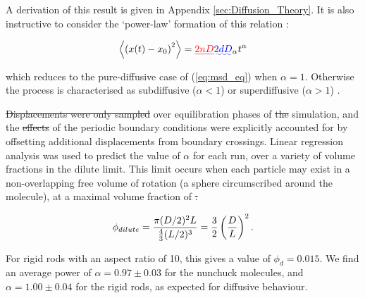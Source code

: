 \documentclass[11pt, a4paper]{article} %
\providecommand{\DIFadd}[1]{{\protect\color{blue}\uwave{#1}}} %
\providecommand{\DIFdel}[1]{{\protect\color{red}\sout{#1}}}                      %
\providecommand{\DIFaddbegin}{} %
\providecommand{\DIFaddend}{} %
\providecommand{\DIFdelbegin}{} %
\providecommand{\DIFdelend}{} %
\begin{document}
A derivation of this result is given in Appendix \ref{sec:Diffusion_Theory}. It is also instructive to consider the `power-law' formation of this relation \cite{Ernst2013}: 

\begin{equation}
\left\langle \left(x(t) - x_{0}\right)^{2} \right\rangle = \DIFdelbegin \DIFdel{2nD}\DIFdelend \DIFaddbegin \DIFadd{2dD}\DIFaddend _{\alpha}t^{\alpha}
\end{equation}

which reduces to the pure-diffusive case of (\ref{eq:msd_eq}) when $\alpha=1$. Otherwise the process is characterised as subdiffusive ($\alpha < 1$) or superdiffusive ($\alpha > 1$) \cite{Metzler2000}. 

\DIFdelbegin \DIFdel{Displacements were only sampled }\DIFdelend \DIFaddbegin \DIFadd{\textcolor{forestgreen}{Displacements were only sampled} }\DIFaddend over equilibration phases of \DIFdelbegin \DIFdel{the }\DIFdelend \DIFaddbegin \DIFadd{our }\DIFaddend simulation, and the \DIFdelbegin \DIFdel{effects }\DIFdelend \DIFaddbegin \DIFadd{effect }\DIFaddend of the periodic boundary conditions were explicitly accounted for by offsetting additional displacements from boundary crossings. Linear regression analysis was used to predict the value of $\alpha$ for each run, over a variety of volume fractions in the dilute limit. This limit occurs when each particle may exist in a non-overlapping free volume of rotation (a sphere circumscribed around the molecule), at a maximal volume fraction of
\DIFdelbegin \DIFdel{:
}\DIFdelend 

\begin{equation}
\phi_{dilute} = \frac{\pi(D/2)^{2}L}{\frac{4}{3}(L/2)^{3}} = \frac{3}{2} \left( \frac{D}{L}\right)^{2}\DIFaddbegin \DIFadd{. 
}\DIFaddend \end{equation}

For rigid rods with an aspect ratio of 10, this gives a value of $\phi_{d} = 0.015$. We find an average power of $ \alpha = 0.97 \pm 0.03 $ for the nunchuck molecules, and $ \alpha = 1.00 \pm 0.04 $ for the rigid rods, as expected for diffusive behaviour. 
\end{document}
